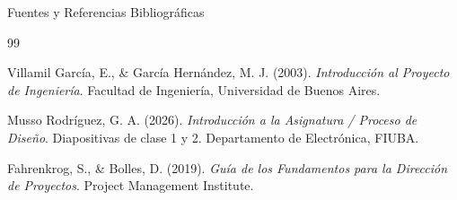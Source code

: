 \documentclass[10pt, aspectratio=169]{beamer}
\begin{document}
\begin{frame}{Fuentes y Referencias Bibliográficas}

  \begin{thebibliography}{99}

    Villamil García, E., \& García Hernández, M. J. (2003).
    \textit{Introducción al Proyecto de Ingeniería}.
    Facultad de Ingeniería, Universidad de Buenos Aires.

    \vspace{0.15cm}

    Musso Rodríguez, G. A. (2026).
    \textit{Introducción a la Asignatura / Proceso de Diseño}.
    Diapositivas de clase 1 y 2.
    Departamento de Electrónica, FIUBA.

    \vspace{0.15cm}

    Fahrenkrog, S., \& Bolles, D. (2019).
    \textit{Guía de los Fundamentos para la Dirección de Proyectos}.
    Project Management Institute.

  \end{thebibliography}

\end{frame}


\end{document}
